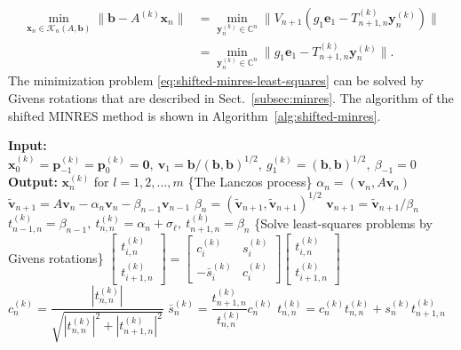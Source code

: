 \begin{equation}\label{eq:shifted-minres-least-squares}\begin{aligned}\min_{\bm x_n\in\mathcal K_n(A,\bm b)}\|\bm b-A^{(k)}\bm x_n\|&=\min_{\bm y_n^{(k)}\in\mathbb C^n}\|V_{n+1}(g_1\bm e_1-T_{n+1,n}^{(k)}\bm y_n^{(k)})\|\\&=\min_{\bm y_n^{(k)}\in\mathbb C^n}\|g_1\bm e_1-T_{n+1,n}^{(k)}\bm y_n^{(k)}\|.\end{aligned}\end{equation}
{The minimization problem \eqref{eq:shifted-minres-least-squares} can be solved by Givens rotations that are described in Sect.\ \ref{subsec:minres}. The algorithm of the shifted MINRES method is shown in Algorithm\ \ref{alg:shifted-minres}.}
\begin{algorithm}[H]\caption{{The shifted MINRES method}}\label{alg:shifted-minres}\begin{algorithmic}[1]
\Statex\textbf{Input:} $\bm x_0^{(k)}=\bm p_{-1}^{(k)}=\bm p_0^{(k)}=\bm0,\ \bm v_1=\bm b/(\bm b,\bm b)^{1/2},\ g_1^{(k)}=(\bm b,\bm b)^{1/2},\ \beta_{-1}=0$
\Statex\textbf{Output:} $\bm x_n^{(k)}$ {for} $l=1,2,\ldots,m$
\State \{{The Lanczos process}\}
\State $\alpha_n=(\bm v_n,A\bm v_n)$
\State $\widetilde{\bm v}_{n+1}=A\bm v_n-\alpha_n\bm v_n-\beta_{n-1}\bm v_{n-1}$
\State $\beta_n=(\widetilde{\bm v}_{n+1},\widetilde{\bm v}_{n+1})^{1/2}$
\State $\bm v_{n+1}=\widetilde{\bm v}_{n+1}/\beta_n$
\State $t_{n-1,n}^{(k)}=\beta_{n-1},\ t_{n,n}^{(k)}=\alpha_n+\sigma_{\ell},\ t_{n+1,n}^{(k)}=\beta_n$
\State \{{Solve least-squares problems by Givens rotations}\}
\State $\begin{bmatrix}t_{i,n}^{(k)}\\t_{i+1,n}^{(k)}\end{bmatrix}=\begin{bmatrix}c_i^{(k)}&s_i^{(k)}\\-\bar s_i^{(k)}&c_i^{(k)}\end{bmatrix}\begin{bmatrix}t_{i,n}^{(k)}\\t_{i+1,n}^{(k)}\end{bmatrix}$
\EndFor
\State $c_n^{(k)}=\dfrac{|t_{n,n}^{(k)}|}{\sqrt{|t_{n,n}^{(k)}|^2+|t_{n+1,n}^{(k)}|^2}}$
\State $\bar s_n^{(k)}=\dfrac{t_{n+1,n}^{(k)}}{t_{n,n}^{(k)}}c_n^{(k)}$
\State $t_{n,n}^{(k)}=c_n^{(k)}t_{n,n}^{(k)}+s_n^{(k)}t_{n+1,n}^{(k)}$

\end{algorithmic}
\end{algorithm}
